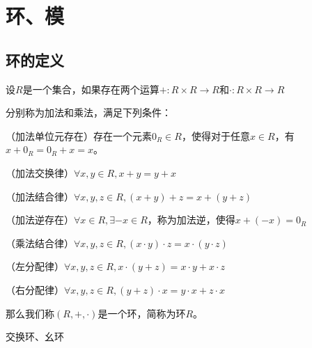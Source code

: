 \documentclass[12pt, a4paper, oneside, UTF8]{ctexbook}
\begin{document}
% 
\else
\fi
\chapter{环、模}
	\section{环的定义}
		\begin{defn}{}
			设$R$是一个集合，如果存在两个运算$+ : R \times R \rightarrow R$和$\cdot : R \times R \rightarrow R$

			分别称为加法和乘法，满足下列条件：

			 （加法单位元存在）存在一个元素$0_R \in R$，使得对于任意$x \in R$，有$x + 0_R = 0_R + x = x$。

			 （加法交换律）$\forall x, y \in R,x + y = y + x$

			 （加法结合律）$\forall x, y, z \in R,(x + y) + z = x + (y + z)$

			 （加法逆存在）$\forall x \in R,\exists -x \in R$，称为加法逆，使得$x + (-x) = 0_R$

			 （乘法结合律）$\forall x, y, z \in R,(x \cdot y) \cdot z = x \cdot (y \cdot z)$

			 （左分配律）$\forall x, y, z \in R,x \cdot (y + z) = x \cdot y + x \cdot z$
						
						（右分配律）$\forall x, y, z \in R,(y + z) \cdot x = y \cdot x + z \cdot x$

			那么我们称$(R,+,\cdot)$是一个环，简称为环$R$。
		\end{defn}
		\begin{defn}{交换环、幺环}{}
			
		\end{defn}
\ifx\allfiles\undefined
\end{document}
